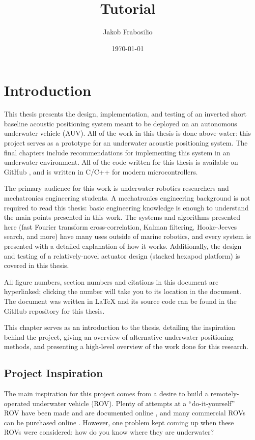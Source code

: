 \documentclass[12pt,a4paper]{report}
\title{Tutorial}
\author{Jakob Frabosilio}
\date{\today}
\begin{document}
	
\chapter{Introduction} \label{chap:1c}
This thesis presents the design, implementation, and testing of an inverted short baseline acoustic positioning system meant to be deployed on an autonomous underwater vehicle (AUV). All of the work in this thesis is done above-water: this project serves as a prototype for an underwater acoustic positioning system. The final chapters include recommendations for implementing this system in an underwater environment. All of the code written for this thesis is available on GitHub \cite{thesisgit}, and is written in C/C++ for modern microcontrollers.

The primary audience for this work is underwater robotics researchers and mechatronics engineering students. A mechatronics engineering background is not required to read this thesis: basic engineering knowledge is enough to understand the main points presented in this work. The systems and algorithms presented here (fast Fourier transform cross-correlation, Kalman filtering, Hooke-Jeeves search, and more) have many uses outside of marine robotics, and every system is presented with a detailed explanation of how it works. Additionally, the design and testing of a relatively-novel actuator design (stacked hexapod platform) is covered in this thesis.

All figure numbers, section numbers and citations in this document are hyperlinked; clicking the number will take you to its location in the document. The document was written in LaTeX and its source code can be found in the GitHub repository for this thesis.

This chapter serves as an introduction to the thesis, detailing the inspiration behind the project, giving an overview of alternative underwater positioning methods, and presenting a high-level overview of the work done for this research. 

\section{Project Inspiration} \label{sec:1s1}
The main inspiration for this project comes from a desire to build a remotely-operated underwater vehicle (ROV). Plenty of attempts at a “do-it-yourself” ROV have been made and are documented online \cite{cpsdrone}, and many commercial ROVs can be purchased online \cite{bluerov}. However, one problem kept coming up when these ROVs were considered: how do you know where they are underwater?
\end{document}
